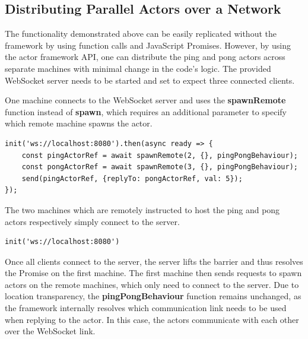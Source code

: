 \documentclass[oneside]{um-fict}
\begin{document}
\subsection{Distributing Parallel Actors over a Network}
The functionality demonstrated above can be easily replicated without the framework by using function calls and JavaScript Promises. However, by using the actor framework API, one can distribute the ping and pong actors across separate machines with minimal change in the code's logic. The provided WebSocket server needs to be started and set to expect three connected clients. 

One machine connects to the WebSocket server and uses the \textbf{spawnRemote} function instead of \textbf{spawn}, which requires an additional parameter to specify which remote machine spawns the actor.
\newpage
\begin{lstlisting}
init('ws://localhost:8080').then(async ready => {
    const pingActorRef = await spawnRemote(2, {}, pingPongBehaviour);
    const pongActorRef = await spawnRemote(3, {}, pingPongBehaviour);
    send(pingActorRef, {replyTo: pongActorRef, val: 5});
});
\end{lstlisting}

The two machines which are remotely instructed to host the ping and pong actors respectively simply connect to the server.
\begin{lstlisting}
init('ws://localhost:8080')
\end{lstlisting}

Once all clients connect to the server, the server lifts the barrier and thus resolves the Promise on the first machine. The first machine then sends requests to spawn actors on the remote machines, which only need to connect to the server. Due to location transparency, the \textbf{pingPongBehaviour} function remains unchanged, as the framework internally resolves which communication link needs to be used when replying to the actor. In this case, the actors communicate with each other over the WebSocket link.
\end{document}
